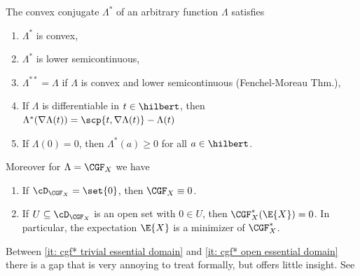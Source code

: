 \begin{lemma}
    \label{lem: properties of cgf*}
    The convex conjugate \(\Lambda^*\) of an arbitrary function \(\Lambda\)
    satisfies
    \begin{enumerate}[label=\normalfont{(\arabic*)}, noitemsep]
        \item\label{it: cgf* convex} \(\Lambda^*\) is convex,
        \item\label{it: cgf* lower semicontinuous} \(\Lambda^*\) is lower semicontinuous,
        \item\label{it: cgf* duality} \(\Lambda^{**} = \Lambda\) if \(\Lambda\) is convex and lower semicontinuous (Fenchel-Moreau Thm.),
        \item\label{it: cgf* gradient} If \(\Lambda\) is
        differentiable in \(t\in \hilbert\), then \(\Lambda^*(\nabla \Lambda(t)) = \scp{t, \nabla \Lambda(t)} - \Lambda(t)\)
        \item\label{it: cgf* minimum at expected value} If \(\Lambda(0) = 0\), then \(\Lambda^*(a) \ge 0\) for all \(a\in \hilbert\).
    \end{enumerate}
    Moreover for \(\Lambda = \CGF_X\) we have
    \begin{enumerate}[label=\normalfont{(\arabic*)}, noitemsep, resume]
        \item\label{it: cgf* trivial essential domain} If \(\cD_{\CGF_X} = \set{0}\), then \(\CGF_X \equiv 0\).
        \item\label{it: cgf* open essential domain} If \(U \subseteq \cD_{\CGF_X}\) is an open set with \(0\in U\), then
        \(\CGF_X^*(\E{X})=0\).
        In particular, the expectation \(\E{X}\) is a minimizer of \(\CGF_X^*\).
    \end{enumerate}
\end{lemma}

\begin{remark}
    Between \ref{it: cgf* trivial essential domain} and \ref{it: cgf* open
    essential domain} there is a gap that is very annoying to treat formally,
    but offers little insight.
    See 
\end{remark}

